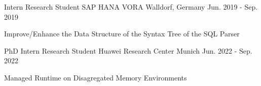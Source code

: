 
\begin{cventries}

	\cventry
	{Intern Research Student} %
	{SAP HANA VORA} %
	{Walldorf, Germany} %
	{Jun. 2019 - Sep. 2019} %
	{
		\begin{cvitems} %
			\item {Improve/Enhance the Data Structure of the Syntax Tree of
			            the SQL Parser}
		\end{cvitems}
	}


	\cventry
	{PhD Intern Research Student} %
	{Huawei Research Center} %
	{Munich} %
	{Jun. 2022 - Sep. 2022} %
	{
		\begin{cvitems} %
			\item {Managed Runtime on Disagregated Memory Environments}
		\end{cvitems}
	}

\end{cventries}
